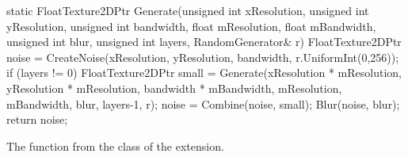 \vspace{7mm}

\begin{listing}
\centering
\begin{cppcode}
    static FloatTexture2DPtr Generate(unsigned int xResolution, unsigned int yResolution,
                                      unsigned int bandwidth, float mResolution,
                                      float mBandwidth, unsigned int blur,
                                      unsigned int layers, RandomGenerator& r) {
            FloatTexture2DPtr noise =
                    CreateNoise(xResolution, yResolution, bandwidth, r.UniformInt(0,256));
            if (layers != 0) {
                FloatTexture2DPtr small = 
                    Generate(xResolution * mResolution, yResolution * mResolution, 
                             bandwidth * mBandwidth, mResolution, mBandwidth,
                             blur, layers-1, r);
                noise = Combine(noise, small);
                Blur(noise, blur);
            }
            return noise;
    }
\end{cppcode}
\caption{The  function from the  class
  of the  extension.}
\label{lst:noisegeneration}
\end{listing}

